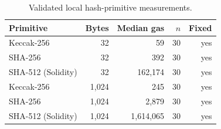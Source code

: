 \begin{table}[!t]
\centering
\caption{Validated local hash-primitive measurements.}
\label{tab:hash-primitive-microbenchmark}
\small
\begin{tabular}{lrrrr}
\toprule
Primitive & Bytes & Median gas & $n$ & Fixed \\
\midrule
Keccak-256 & 32 & 59 & 30 & yes \\
SHA-256 & 32 & 392 & 30 & yes \\
SHA-512 (Solidity) & 32 & 162,174 & 30 & yes \\
Keccak-256 & 1,024 & 245 & 30 & yes \\
SHA-256 & 1,024 & 2,879 & 30 & yes \\
SHA-512 (Solidity) & 1,024 & 1,614,065 & 30 & yes \\
\bottomrule
\end{tabular}
\end{table}
